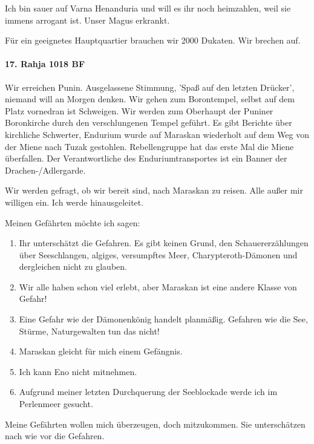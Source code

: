 Ich bin sauer auf Varna Henanduria und will es ihr noch heimzahlen, weil sie immens arrogant ist. Unser Magus erkrankt. 

Für ein geeignetes Hauptquartier brauchen wir 2000 Dukaten. Wir brechen auf. 

\paragraph{17. Rahja 1018 BF}
\label{sec:mitte-rahja-1018}
Wir erreichen Punin. Ausgelassene Stimmung, 'Spaß auf den letzten Drücker', niemand will an Morgen denken. Wir gehen zum Borontempel, selbst auf dem Platz vornedran ist Schweigen. 
Wir werden zum Oberhaupt der Puniner Boronkirche durch den verschlungenen Tempel geführt. Es gibt Berichte über kirchliche Schwerter, Endurium wurde auf Maraskan wiederholt auf dem Weg von der Miene  nach Tuzak gestohlen. Rebellengruppe  hat das erste Mal die Miene überfallen. Der Verantwortliche des Enduriumtransportes ist ein Banner der Drachen-/Adlergarde. 

Wir werden gefragt, ob wir bereit sind, nach Maraskan zu reisen. Alle außer mir willigen ein. Ich werde hinausgeleitet.


Meinen Gefährten möchte ich sagen:
\begin{enumerate}
\item Ihr unterschätzt die Gefahren. Es gibt keinen Grund, den Schauererzählungen über Seeschlangen, algiges, versumpftes Meer, Charypteroth-Dämonen und dergleichen nicht zu glauben.
\item Wir alle haben schon viel erlebt, aber Maraskan ist eine andere Klasse von Gefahr!
\item Eine Gefahr wie der Dämonenkönig handelt planmäßig. Gefahren wie die See, Stürme, Naturgewalten tun das nicht!
\item Maraskan gleicht für mich einem Gefängnis.
\item Ich kann Eno nicht mitnehmen.
\item Aufgrund meiner letzten Durchquerung der Seeblockade werde ich im Perlenmeer gesucht.
\end{enumerate}
Meine Gefährten wollen mich überzeugen, doch mitzukommen. Sie unterschätzen nach wie vor die Gefahren. 
